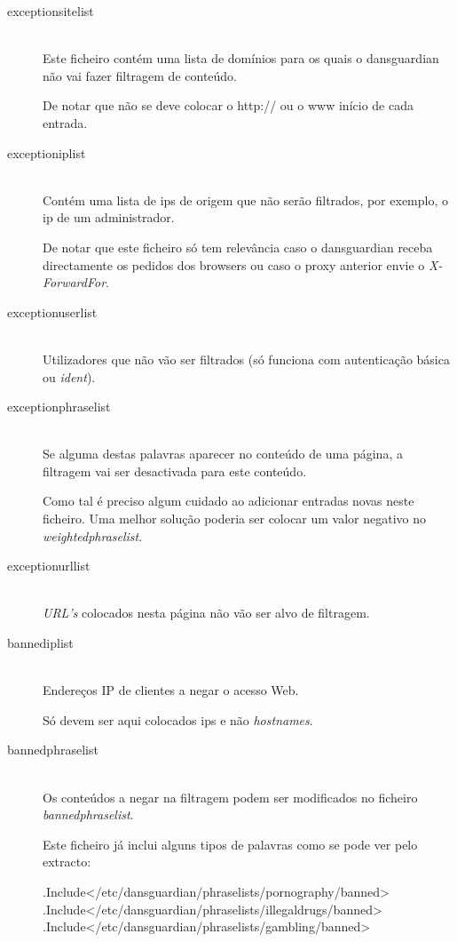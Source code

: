 \begin{description}
\item[exceptionsitelist]~\\
Este ficheiro contém uma lista de domínios para os quais o dansguardian
não vai fazer filtragem de conteúdo.

De notar que não se deve colocar o http:// ou o www início de cada
entrada.

\item[exceptioniplist]~\\
Contém uma lista de ips de origem que não serão filtrados, por exemplo,
o ip de um administrador.

De notar que este ficheiro só tem relevância caso o dansguardian receba
directamente os pedidos dos browsers ou caso o proxy anterior envie o
\emph{X-ForwardFor}.

\item[exceptionuserlist]~\\
Utilizadores que não vão ser filtrados (só funciona com autenticação
básica ou \emph{ident}).

\item[exceptionphraselist]~\\
Se alguma destas palavras aparecer no conteúdo de uma página, a
filtragem vai ser desactivada para este conteúdo.

Como tal é preciso algum cuidado ao adicionar entradas novas neste
ficheiro. 
Uma melhor solução poderia ser colocar um valor negativo no
\emph{weightedphraselist}.

\item[exceptionurllist]~\\
\emph{URL's} colocados nesta página não vão ser alvo de filtragem.

\item[bannediplist]~\\
Endereços IP de clientes a negar o acesso Web.

Só devem ser aqui colocados ips e não \emph{hostnames}.

\item[bannedphraselist]~\\
Os conteúdos a negar na filtragem podem ser modificados no ficheiro
\emph{bannedphraselist}.

Este ficheiro já inclui alguns tipos de palavras como se pode ver pelo
extracto:

\begin{Output}
.Include</etc/dansguardian/phraselists/pornography/banned>
.Include</etc/dansguardian/phraselists/illegaldrugs/banned>
.Include</etc/dansguardian/phraselists/gambling/banned>
\end{Output}


\end{description}
